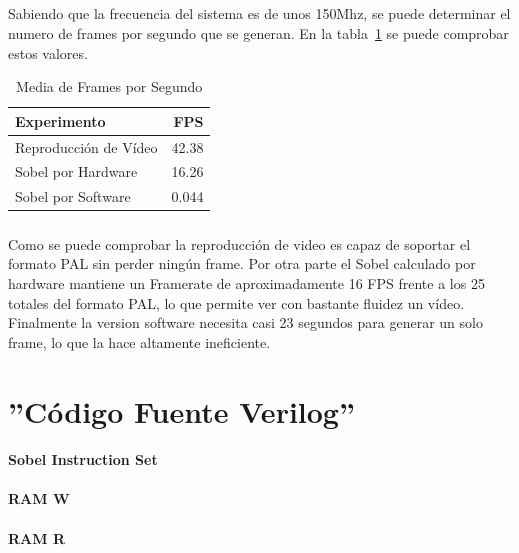 \documentclass[a4paper,12pt,titlepage,final]{book}
\begin{document}
\paragraph{}
Sabiendo que la frecuencia del sistema es de unos 150Mhz, se puede determinar el numero de frames por segundo que se generan. En la tabla~\ref{tab:resutadosf} se puede comprobar estos valores.

\begin{table}[hd]
\centering
\begin{tabular}{l r}
Experimento            & FPS \\
\hline
Reproducción de Vídeo  & 42.38 \\
Sobel por Hardware     & 16.26 \\
Sobel por Software     & 0.044 \\
\end{tabular}
\caption{Media de Frames por Segundo}
\label{tab:resutadosf}
\end{table}

\paragraph{}
Como se puede comprobar la reproducción de video es capaz de soportar el formato PAL sin perder ningún frame. Por otra parte el Sobel calculado por hardware mantiene un Framerate de aproximadamente 16 FPS frente a los 25 totales del formato PAL, lo que permite ver con bastante fluidez un vídeo. Finalmente la version software necesita casi 23 segundos para generar un solo frame, lo que la hace altamente ineficiente.

\appendix
\pagestyle{empty}
\appendixpage
\noappendicestocpagenum
\addappheadtotoc

\chapter{''Código Fuente Verilog''}
\subsubsection{Sobel Instruction Set}

\subsubsection{RAM W}

\subsubsection{RAM R}

\end{document}
